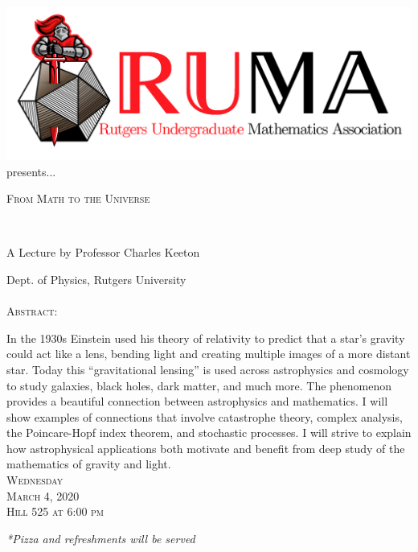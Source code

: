 \documentclass[12pt]{article}
\begin{document}

\begin{center}\includegraphics[scale=.40]{RUMAlogo.png}\\
presents... \\
\begin{spacing}{1}
{\fontsize{40}{44}\selectfont  \textsc{
From Math to the Universe}} \end{spacing}
 

~~\\
\begin{spacing}{1.5}
{\fontsize{24}{24} \selectfont A Lecture by Professor Charles
  Keeton}  \end{spacing} 
\large Dept. of Physics, Rutgers University \\~~\\

\normalsize
\textsc{Abstract:}

\Large
In the 1930s Einstein used his theory of relativity to predict
that a star's gravity could act like a lens, bending light and
creating multiple images of a more distant star. Today this
``gravitational lensing'' is used across astrophysics and cosmology
to study galaxies, black holes, dark matter, and much more. The
phenomenon provides a beautiful connection between astrophysics
and mathematics. I will show examples of connections that involve
catastrophe theory, complex analysis, the Poincare-Hopf index
theorem, and stochastic processes. I will strive to explain how
astrophysical applications both motivate and benefit from deep
study of the mathematics of gravity and light. 
\\

\vspace{5mm} 
\Huge   \textsc{Wednesday\\March 4, 2020 \\Hill 525 at 6:00
  pm}

\vspace{2mm}
\large
\emph{*Pizza and refreshments will be served}
\end{center}
\end{document}
